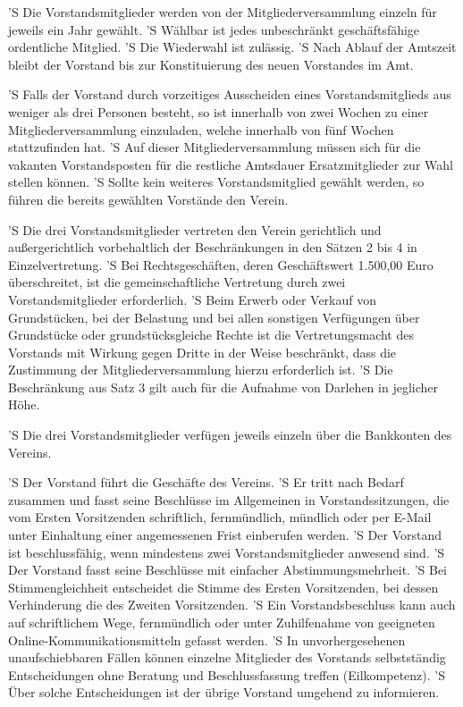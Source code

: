 \documentclass[a4paper,10pt]{scrreprt}
\begin{document}
\begin{contract}
'S Die Vorstandsmitglieder werden von der Mitgliederversammlung einzeln für
jeweils ein Jahr gewählt.
'S Wählbar ist jedes unbeschränkt geschäftsfähige ordentliche Mitglied.
'S Die Wiederwahl ist zulässig.
'S Nach Ablauf der Amtszeit bleibt der Vorstand bis zur Konstituierung des
neuen Vorstandes im Amt.

'S Falls der Vorstand durch vorzeitiges Ausscheiden eines Vorstandsmitglieds
aus weniger als drei Personen besteht, so ist innerhalb von zwei Wochen zu
einer Mitgliederversammlung einzuladen, welche innerhalb von fünf Wochen
stattzufinden hat.
'S Auf dieser Mitgliederversammlung müssen sich für die vakanten Vorstandsposten
für die restliche Amtsdauer Ersatzmitglieder zur Wahl stellen können.
'S Sollte kein weiteres Vorstandsmitglied gewählt werden, so führen die bereits
gewählten Vorstände den Verein.

'S Die drei Vorstandsmitglieder vertreten den Verein gerichtlich und
außergerichtlich vorbehaltlich der Beschränkungen in den Sätzen 2 bis 4 in
Einzelvertretung.
'S Bei Rechtsgeschäften, deren Geschäftswert 1.500,00 Euro überschreitet, ist
die gemeinschaftliche Vertretung durch zwei Vorstandsmitglieder erforderlich.
'S Beim Erwerb oder Verkauf von Grundstücken, bei der Belastung und bei allen
sonstigen Verfügungen über Grundstücke oder grundstücksgleiche Rechte ist die
Vertretungsmacht des Vorstands mit Wirkung gegen Dritte in der Weise
beschränkt, dass die Zustimmung der Mitgliederversammlung hierzu erforderlich
ist.
'S Die Beschränkung aus Satz 3 gilt auch für die Aufnahme von Darlehen in
jeglicher Höhe.

'S Die drei Vorstandsmitglieder verfügen jeweils einzeln über die Bankkonten
des Vereins.

'S Der Vorstand führt die Geschäfte des Vereins.
'S Er tritt nach Bedarf zusammen und fasst seine Beschlüsse im Allgemeinen in
Vorstandssitzungen, die vom Ersten Vorsitzenden schriftlich, fernmündlich,
mündlich oder per E-Mail unter Einhaltung einer angemessenen Frist einberufen
werden.
'S Der Vorstand ist beschlussfähig, wenn mindestens zwei Vorstandsmitglieder
anwesend sind.
'S Der Vorstand fasst seine Beschlüsse mit einfacher Abstimmungsmehrheit.
'S Bei Stimmengleichheit entscheidet die Stimme des Ersten Vorsitzenden, bei
dessen Verhinderung die des Zweiten Vorsitzenden.
'S Ein Vorstandsbeschluss kann auch auf schriftlichem Wege, fernmündlich oder
unter Zuhilfenahme von geeigneten Online-Kommunikationsmitteln gefasst werden.
'S In unvorhergesehenen unaufschiebbaren Fällen können einzelne Mitglieder des
Vorstands selbstständig Entscheidungen ohne Beratung und Beschlussfassung
treffen (Eilkompetenz).
'S Über solche Entscheidungen ist der übrige Vorstand umgehend zu informieren.


\end{contract}
\end{document}
